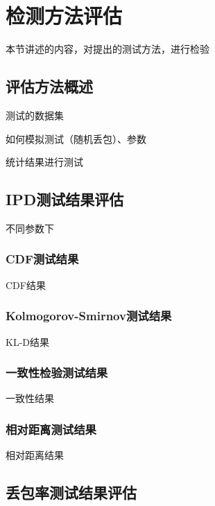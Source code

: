 \section{检测方法评估}
\label{chap:analyze:result}

本节讲述的内容，对提出的测试方法，进行检验

\subsection{评估方法概述}
\label{chap:analyze:result:abstract}

测试的数据集

如何模拟测试（随机丢包）、参数

统计结果进行测试

\subsection{IPD测试结果评估}
\label{chap:analyze:result:ipd}

不同参数下

\subsubsection{CDF测试结果}
\label{chap:analyze:result:ipd:cdf}

CDF结果

\subsubsection{Kolmogorov-Smirnov测试结果}
\label{chap:analyze:result:ipd:kld}

KL-D结果

\subsubsection{一致性检验测试结果}
\label{chap:analyze:result:ipd:statistical}

一致性结果

\subsubsection{相对距离测试结果}
\label{chap:analyze:result:ipd:distance}

相对距离结果

\subsection{丢包率测试结果评估}
\label{chap:analyze:result:window}


